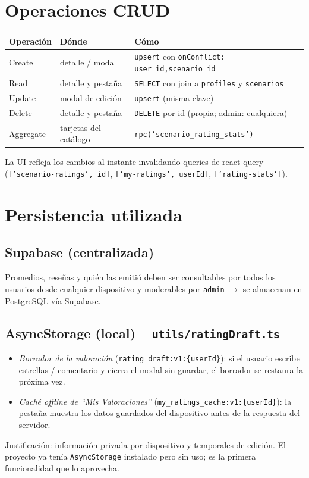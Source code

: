 \documentclass[11pt,a4paper]{article}
\begin{document}
\section{Operaciones CRUD}
\label{sec:crud}

\begin{center}
\begin{tabularx}{\textwidth}{@{}l>{\raggedright\arraybackslash}p{4.2cm}X@{}}
\toprule
\textbf{Operación} & \textbf{Dónde} & \textbf{Cómo}\\
\midrule
Create & detalle / modal & \texttt{upsert} con \texttt{onConflict: user\_id,scenario\_id}\\
Read & detalle y pestaña & \texttt{SELECT} con join a \texttt{profiles} y \texttt{scenarios}\\
Update & modal de edición & \texttt{upsert} (misma clave)\\
Delete & detalle y pestaña & \texttt{DELETE} por id (propia; admin: cualquiera)\\
Aggregate & tarjetas del catálogo & \texttt{rpc('scenario\_rating\_stats')}\\
\bottomrule
\end{tabularx}
\end{center}

La UI refleja los cambios al instante invalidando queries de react-query
(\texttt{['scenario-ratings', id]}, \texttt{['my-ratings', userId]}, \texttt{['rating-stats']}).

\section{Persistencia utilizada}
\label{sec:persistencia}

\subsection{Supabase (centralizada)}
Promedios, reseñas y quién las emitió deben ser consultables por todos los usuarios desde
cualquier dispositivo y moderables por \texttt{admin} $\rightarrow$ se almacenan en PostgreSQL
vía Supabase.

\subsection{AsyncStorage (local) -- \texttt{utils/ratingDraft.ts}}
\begin{itemize}
  \item \emph{Borrador de la valoración} (\texttt{rating\_draft:v1:\{userId\}}): si el usuario
        escribe estrellas / comentario y cierra el modal sin guardar, el borrador se restaura la
        próxima vez.
  \item \emph{Caché offline de ``Mis Valoraciones''} (\texttt{my\_ratings\_cache:v1:\{userId\}}):
        la pestaña muestra los datos guardados del dispositivo antes de la respuesta del servidor.
\end{itemize}
Justificación: información privada por dispositivo y temporales de edición. El proyecto ya tenía
\texttt{AsyncStorage} instalado pero sin uso; es la primera funcionalidad que lo aprovecha.
\end{document}
